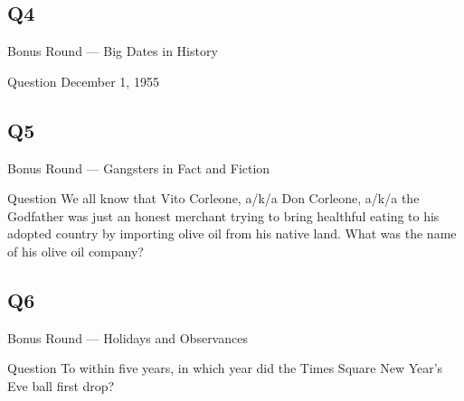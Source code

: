 \documentclass[11pt]{beamer}
\begin{document}
\subsection*{Q4}
\begin{frame}[t]{Bonus Round --- Big Dates in History}
\begin{block}{Question}
December 1, 1955
\end{block}
\end{frame}
\subsection*{Q5}
\begin{frame}[t]{Bonus Round --- Gangsters in Fact and Fiction}
\begin{block}{Question}
We all know that Vito Corleone, a/k/a Don Corleone, a/k/a the Godfather was just an honest merchant trying to bring healthful eating to his adopted country by importing olive oil from his native land.  What was the name of his olive oil company?
\end{block}
\end{frame}
\subsection*{Q6}
\begin{frame}[t]{Bonus Round --- Holidays and Observances}
\begin{block}{Question}
To within five years, in which year did the Times Square New Year's Eve ball first drop?
\end{block}
\end{frame}
\end{document}

